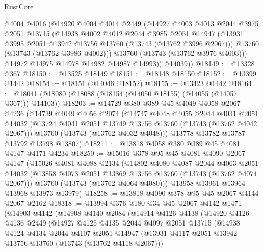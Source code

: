 \begin{lexlean}{RustCore}
\begin{coremodule}
          @4004
          @4016
          (@14920
            @4004
            @4014
            @2449
            (@14927
              @4003
              @4013
              @2044
              @3975
              @2051
              @13715
              (@14938
                @4002
                @4012
                @2044
                @3985
                @2051
                @14947
                (@13931 @3995 @2051 @13942 @13756 @13760 (@13743 (@13762 @3996 @2067)))
                @13760
                (@13743 (@13762 @3986 @4002)))
              @13760
              (@13743 (@13762 @3976 @4003)))
            @14972
            @14975
            @14978
            @14982
            @14987
            @14993))
        @14039))
@18149 := @13328 @367
@18150 := @13525 @18149
@18151 := @18148 @18150
@18152 := @13399 @1442
@18154 := @18151 (@14046 @18152)
@18155 := @13423 @1442
@18164 := @18041 (@18080 (@18088 (@18154 (@14050 @18155) (@14055 (@14057 @367))) @14103))
@18203 := @14729
    @380
    @389
    @45
    @4049
    @4058
    @2067
    @4236
    (@14739
      @4049
      @4056
      @2074
      (@14747
        @4048
        @4055
        @2044
        @4031
        @2051
        @14032
        (@13724 @4041 @2051 @13749 @13756 @13760 (@13743 (@13762 @4042 @2067)))
        @13760
        (@13743 (@13762 @4032 @4048)))
      @13778
      @13782
      @13787
      @13792
      @13798
      @13807)
@18211 := @13818 @4058 @380 @389 @45 @4081 @4147 @4171 @4234
@18250 := @15016
    @378
    @95
    @45
    @4081
    @4090
    @2067
    @4147
    (@15026
      @4081
      @4088
      @2134
      (@14802
        @4080
        @4087
        @2044
        @4063
        @2051
        @14032
        (@13858 @4073 @2051 @13869 @13756 @13760 (@13743 (@13762 @4074 @2067)))
        @13760
        (@13743 (@13762 @4064 @4080)))
      @13958
      @13961
      @13964
      @13968
      @13973
      @13979)
@18258 := @13818 @4090 @378 @95 @45 @2067 @4144 @2067 @2162
@18318 := @13994
    @376
    @180
    @34
    @45
    @2067
    @4142
    @1471
    (@14903
      @4142
      (@14908
        @4140
        @2084
        (@14914
          @4126
          @4138
          (@14920
            @4126
            @4136
            @2449
            (@14927
              @4125
              @4135
              @2044
              @4097
              @2051
              @13715
              (@14938
                @4124
                @4134
                @2044
                @4107
                @2051
                @14947
                (@13931 @4117 @2051 @13942 @13756 @13760 (@13743 (@13762 @4118 @2067)))

\end{coremodule}
\end{lexlean}
